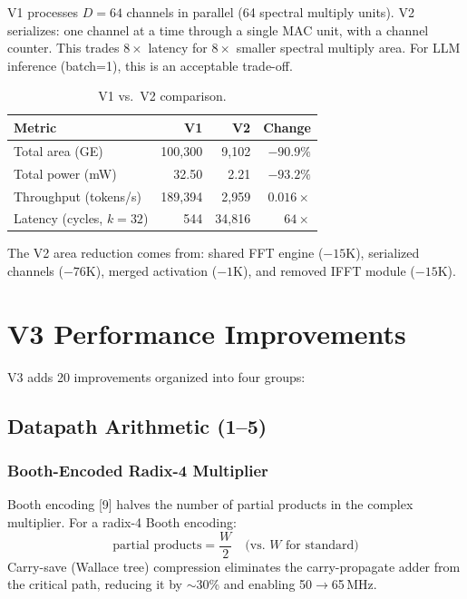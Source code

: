 \documentclass[11pt,a4paper]{article}
\theoremstyle{definition}
\theoremstyle{remark}
\begin{document}
V1 processes $D=64$ channels in parallel (64 spectral multiply units). V2
serializes: one channel at a time through a single MAC unit, with a channel
counter. This trades $8\times$ latency for $8\times$ smaller spectral multiply
area. For LLM inference (batch=1), this is an acceptable trade-off.

\begin{table}[h]
\centering
\caption{V1 vs.\ V2 comparison.}
\label{tab:v1v2}
\begin{tabular}{lrrr}
\toprule
\textbf{Metric} & \textbf{V1} & \textbf{V2} & \textbf{Change} \\
\midrule
Total area (GE) & 100{,}300 & 9{,}102 & $-90.9\%$ \\
Total power (mW) & 32.50 & 2.21 & $-93.2\%$ \\
Throughput (tokens/s) & 189{,}394 & 2{,}959 & $0.016\times$ \\
Latency (cycles, $k=32$) & 544 & 34{,}816 & $64\times$ \\
\bottomrule
\end{tabular}
\end{table}

The V2 area reduction comes from: shared FFT engine ($-15$K), serialized
channels ($-76$K), merged activation ($-1$K), and removed IFFT module ($-15$K).

\section{V3 Performance Improvements}

V3 adds 20 improvements organized into four groups:

\subsection{Datapath Arithmetic (1--5)}

\subsubsection{Booth-Encoded Radix-4 Multiplier}
Booth encoding [9] halves the number of partial products
in the complex multiplier. For a radix-4 Booth encoding:
\begin{equation}
  \text{partial products} = \frac{W}{2} \quad \text{(vs.\ $W$ for standard)}
\end{equation}
Carry-save (Wallace tree) compression eliminates the carry-propagate adder
from the critical path, reducing it by $\sim$30\% and enabling 50$\to$65\,MHz.
\end{document}
